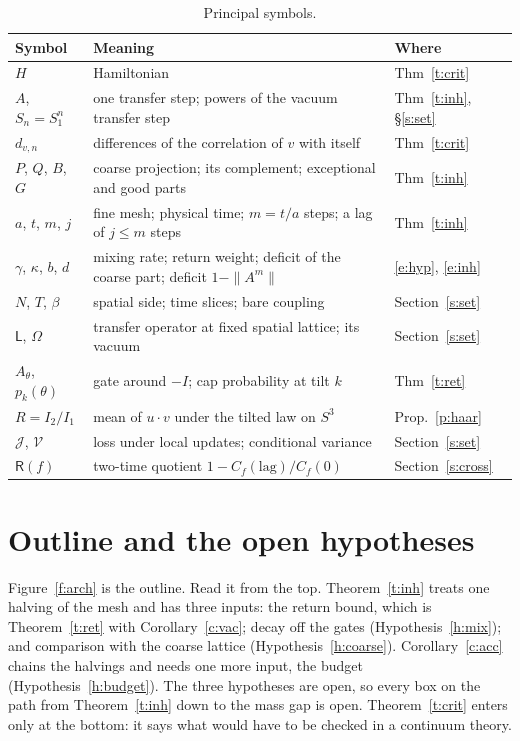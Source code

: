 \begin{table}[ht]
\centering\small
\begin{tabular}{@{}lll@{}}
\toprule
Symbol & Meaning & Where \\
\midrule
$H$ & Hamiltonian & Thm~\ref{t:crit} \\
$A$, $S_n=S_1^n$ & one transfer step; powers of the vacuum transfer step & Thm~\ref{t:inh}, \S\ref{s:set} \\
$d_{v,n}$ & differences of the correlation of $v$ with itself & Thm~\ref{t:crit} \\
$P$, $Q$, $B$, $G$ & coarse projection; its complement; exceptional and good parts & Thm~\ref{t:inh} \\
$a$, $t$, $m$, $j$ & fine mesh; physical time; $m=t/a$ steps; a lag of $j\le m$ steps & Thm~\ref{t:inh} \\
$\gamma$, $\kappa$, $b$, $d$ & mixing rate; return weight; deficit of the coarse part; deficit $1-\|A^m\|$ & \eqref{e:hyp}, \eqref{e:inh} \\
$N$, $T$, $\beta$ & spatial side; time slices; bare coupling & Section~\ref{s:set} \\
$\mathsf L$, $\Omega$ & transfer operator at fixed spatial lattice; its vacuum & Section~\ref{s:set} \\
$A_\theta$, $p_k(\theta)$ & gate around $-I$; cap probability at tilt $k$ & Thm~\ref{t:ret} \\
$R=I_2/I_1$ & mean of $u\cdot v$ under the tilted law on $S^3$ & Prop.~\ref{p:haar} \\
$\mathcal J$, $\mathcal V$ & loss under local updates; conditional variance & Section~\ref{s:set} \\
$\mathsf R(f)$ & two-time quotient $1-C_f(\text{lag})/C_f(0)$ & Section~\ref{s:cross} \\
\bottomrule
\end{tabular}
\caption{Principal symbols.}\label{tab:sym}
\end{table}

\section{Outline and the open hypotheses}\label{s:arch}
Figure~\ref{f:arch} is the outline. Read it from the top. Theorem~\ref{t:inh} treats one halving of the mesh and
has three inputs: the return bound, which is Theorem~\ref{t:ret} with Corollary~\ref{c:vac}; decay off the
gates (Hypothesis~\ref{h:mix}); and comparison with the coarse lattice (Hypothesis~\ref{h:coarse}).
Corollary~\ref{c:acc} chains the halvings and needs one more input, the budget (Hypothesis~\ref{h:budget}). The
three hypotheses are open, so every box on the path from Theorem~\ref{t:inh} down to the mass gap is open.
Theorem~\ref{t:crit} enters only at the bottom: it says what would have to be checked in a continuum theory.

